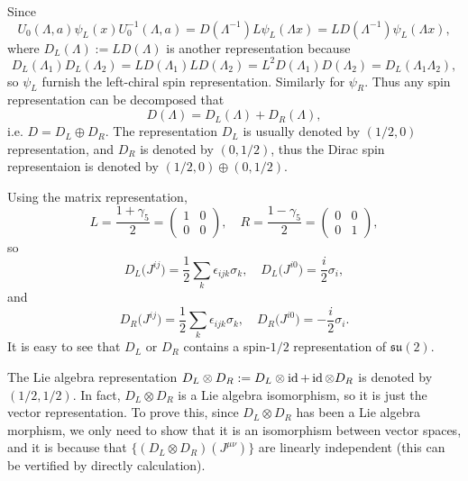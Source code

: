 \documentclass[8pt]{book}
\begin{document}
Since
\[
	U_0(\Lambda,a)\psi_L(x)U_0^{-1}(\Lambda,a)=D(\Lambda^{-1})L\psi_L(\Lambda x)=LD(\Lambda^{-1})\psi_L(\Lambda x),
\]
where $D_L(\Lambda):=LD(\Lambda)$ is another representation because
\[
	D_L(\Lambda_1)D_L(\Lambda_2)=LD(\Lambda_1)LD(\Lambda_2)=L^2D(\Lambda_1)D(\Lambda_2)=D_L(\Lambda_1\Lambda_2),
\]
so $\psi_L$ furnish the left-chiral spin representation. Similarly for $\psi_R$. Thus any spin representation can be decomposed that
\[
	D(\Lambda)=D_L(\Lambda)+D_R(\Lambda),
\]
i.e. $D=D_L\oplus D_R$. The representation $D_L$ is usually denoted by $(1/2,0)$ representation, and $D_R$ is denoted by $(0,1/2)$, thus the Dirac spin representaion is denoted by $(1/2,0)\oplus (0,1/2)$.

Using the matrix representation,
\[
	L=\frac{1+\gamma_5}{2}=\begin{pmatrix}
		1&0\\
		0&0
	\end{pmatrix},\quad R=\frac{1-\gamma_5}{2}=\begin{pmatrix}
		0&0\\
		0&1
	\end{pmatrix},
\]
so
\[
	D_L\bigl(J^{ij}\bigr)=\frac{1}{2}\sum_k\epsilon_{ijk}\sigma_k,\quad D_L\bigl(J^{i0}\bigr)=\frac{i}{2}\sigma_i,
\]
and
\[
	D_R\bigl(J^{ij}\bigr)=\frac{1}{2}\sum_k\epsilon_{ijk}\sigma_k,\quad D_R\bigl(J^{i0}\bigr)=-\frac{i}{2}\sigma_i.
\]
It is easy to see that $D_L$ or $D_R$ contains a spin-$1/2$ representation of $\mathfrak{su}(2)$.

The Lie algebra representation $D_L\otimes D_R:=D_L\otimes \operatorname{id}+\operatorname{id} \otimes D_R$ is denoted by $(1/2,1/2)$. In fact, $D_L\otimes D_R$ is a Lie algebra isomorphism, so it is just the vector representation. To prove this, since $D_L\otimes D_R$ has been a Lie algebra morphism, we only need to show that it is an isomorphism between vector spaces, and it is because that $\{(D_L\otimes D_R)(J^{\mu\nu})\}$ are linearly independent (this can be vertified by directly calculation). 
\end{document}
